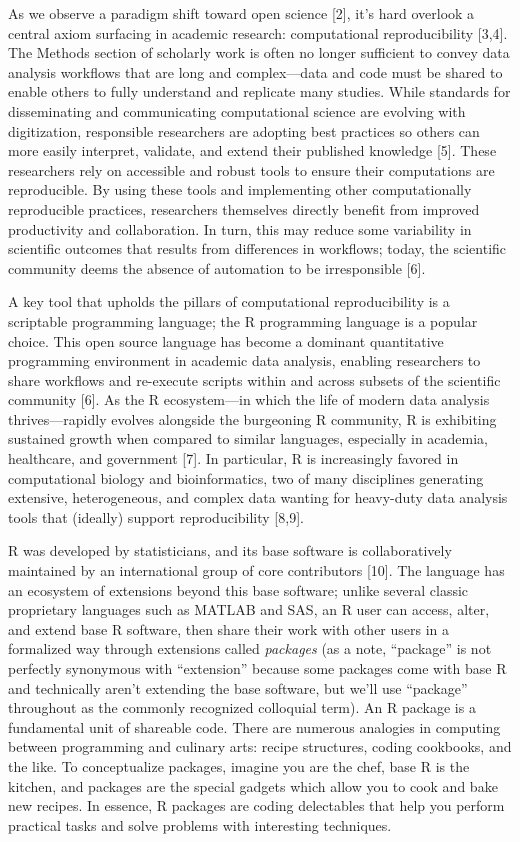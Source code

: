 \documentclass[10pt,letterpaper]{article}
\begin{document}
As we observe a paradigm shift toward open science {[}2{]}, it's hard
overlook a central axiom surfacing in academic research: computational
reproducibility {[}3,4{]}. The Methods section of scholarly work is
often no longer sufficient to convey data analysis workflows that are
long and complex---data and code must be shared to enable others to
fully understand and replicate many studies. While standards for
disseminating and communicating computational science are evolving with
digitization, responsible researchers are adopting best practices so
others can more easily interpret, validate, and extend their published
knowledge {[}5{]}. These researchers rely on accessible and robust tools
to ensure their computations are reproducible. By using these tools and
implementing other computationally reproducible practices, researchers
themselves directly benefit from improved productivity and
collaboration. In turn, this may reduce some variability in scientific
outcomes that results from differences in workflows; today, the
scientific community deems the absence of automation to be irresponsible
{[}6{]}.

A key tool that upholds the pillars of computational reproducibility is
a scriptable programming language; the R programming language is a
popular choice. This open source language has become a dominant
quantitative programming environment in academic data analysis, enabling
researchers to share workflows and re-execute scripts within and across
subsets of the scientific community {[}6{]}. As the R ecosystem---in
which the life of modern data analysis thrives---rapidly evolves
alongside the burgeoning R community, R is exhibiting sustained growth
when compared to similar languages, especially in academia, healthcare,
and government {[}7{]}. In particular, R is increasingly favored in
computational biology and bioinformatics, two of many disciplines
generating extensive, heterogeneous, and complex data wanting for
heavy-duty data analysis tools that (ideally) support reproducibility
{[}8,9{]}.

R was developed by statisticians, and its base software is
collaboratively maintained by an international group of core
contributors {[}10{]}. The language has an ecosystem of extensions
beyond this base software; unlike several classic proprietary languages
such as MATLAB and SAS, an R user can access, alter, and extend base R
software, then share their work with other users in a formalized way
through extensions called \emph{packages} (as a note, ``package'' is not
perfectly synonymous with ``extension'' because some packages come with
base R and technically aren't extending the base software, but we'll use
``package'' throughout as the commonly recognized colloquial term). An R
package is a fundamental unit of shareable code. There are numerous
analogies in computing between programming and culinary arts: recipe
structures, coding cookbooks, and the like. To conceptualize packages,
imagine you are the chef, base R is the kitchen, and packages are the
special gadgets which allow you to cook and bake new recipes. In
essence, R packages are coding delectables that help you perform
practical tasks and solve problems with interesting techniques.
\end{document}
